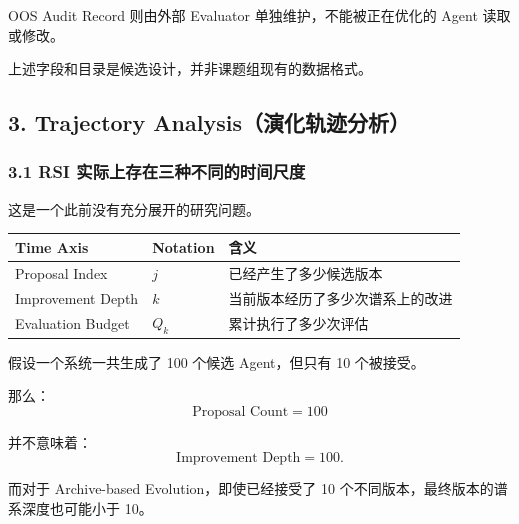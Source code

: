 OOS Audit Record 则由外部 Evaluator 单独维护，不能被正在优化的 Agent 读取或修改。

上述字段和目录是候选设计，并非课题组现有的数据格式。

\hypertarget{part-3-48-0001-trajectory-analysisux6f14ux5316ux8f68ux8ff9ux5206ux6790}{%
\subsection{3. Trajectory Analysis（演化轨迹分析）}\label{part-3-48-0001-trajectory-analysisux6f14ux5316ux8f68ux8ff9ux5206ux6790}}

\hypertarget{part-3-48-0001-rsi-ux5b9eux9645ux4e0aux5b58ux5728ux4e09ux79cdux4e0dux540cux7684ux65f6ux95f4ux5c3aux5ea6}{%
\subsubsection{3.1 RSI 实际上存在三种不同的时间尺度}\label{part-3-48-0001-rsi-ux5b9eux9645ux4e0aux5b58ux5728ux4e09ux79cdux4e0dux540cux7684ux65f6ux95f4ux5c3aux5ea6}}

这是一个此前没有充分展开的研究问题。

\begin{readertable}
\begin{longtable}[]{@{}
  >{\raggedright\arraybackslash}p{}
  >{\raggedright\arraybackslash}p{}
  >{\raggedright\arraybackslash}p{}@{}}
\toprule
Time Axis & Notation & 含义 \\
\midrule
\endhead
Proposal Index & \(j\) & 已经产生了多少候选版本 \\
Improvement Depth & \(k\) & 当前版本经历了多少次谱系上的改进 \\
Evaluation Budget & \(Q_k\) & 累计执行了多少次评估 \\
\bottomrule
\end{longtable}
\end{readertable}

假设一个系统一共生成了 100 个候选 Agent，但只有 10 个被接受。

那么：
\[\text{Proposal Count}=100\]

并不意味着：
\[\text{Improvement Depth}=100.\]

而对于 Archive-based Evolution，即使已经接受了 10 个不同版本，最终版本的谱系深度也可能小于 10。


